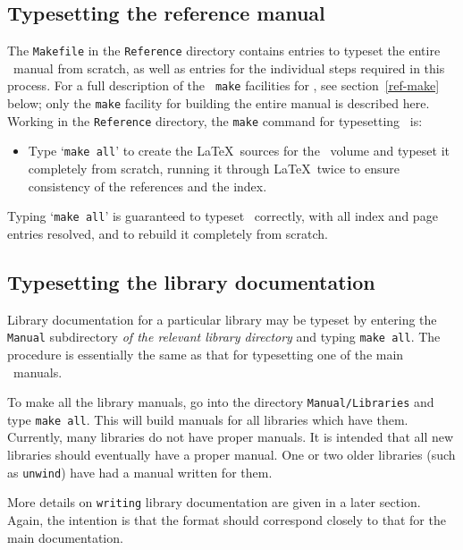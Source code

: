 \documentclass[12pt]{article}
\def\latex{{\LaTeX}}
\begin{document}
\subsection{Typesetting the reference manual}\label{ref-make-all}

The {\tt Makefile} in the {\tt Reference} directory contains entries to typeset
the entire \REFERENCE\ manual from scratch, as well as entries for the
individual steps required in this process.  For a full description of the {\tt
make} facilities for \REFERENCE, see section~\ref{ref-make} below; only the
{\tt make} facility for building the entire manual is described here.  Working
in the {\tt Reference} directory, the {\tt make} command for typesetting
\REFERENCE\ is:

\begin{itemize}

\item Type `{\tt make all}' to create the \LaTeX\ sources for the \REFERENCE\
volume and typeset it completely from scratch, running it through \latex\ twice
to ensure consistency of the references and the index.

\end{itemize}

\noindent Typing `{\tt make all}' is guaranteed to typeset \REFERENCE\
correctly, with all index and page entries resolved, and to rebuild it
completely from scratch.

\subsection{Typesetting the library documentation}

Library documentation for a particular library may be typeset by entering the
{\tt Manual} subdirectory {\it of the relevant library directory} and typing
{\tt make all}. The procedure is essentially the same as that for typesetting
one of the main \HOL\ manuals.

To make all the library manuals, go into the directory {\tt Manual/Libraries}
and type {\tt make all}. This will build manuals for all libraries which have
them. Currently, many libraries do not have proper manuals. It is intended that
all new libraries should eventually have a proper manual. One or two older
libraries (such as {\tt unwind}) have had a manual written for them.

More details on {\tt writing} library documentation are given in a later
section. Again, the intention is that the format should correspond closely to
that for the main documentation.
\end{document}
